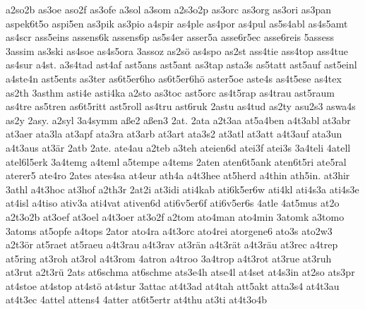 {    a2so2b
    as3oe
    aso2f
    as3ofe
    a3sol
    a3som
    a2s3o2p
    as3orc
    as3org
    as3ori
    as3pan
    aspek6t5o
    aspi5en
    as3pik
    as3pio
    a4spir
    as4ple
    as4por
    as4pul
    as5s4abl
    as4s5amt
    as4scr
    ass5eins
    assens6k
    assens6p
    as5s4er
    asser5a
    asse6r5ec
    asse6reis
    5assess
    3assim
    as3ski
    as4soe
    as4s5ora
    3assoz
    as2sö
    as4spo
    as2st
    ass4tie
    ass4top
    ass4tue
    as4sur
    a4st.
    a3s4tad
    ast4af
    ast5ans
    ast5ant
    as3tap
    asta3s
    as5tatt
    ast5auf
    ast5einl
    a4ste4n
    ast5ents
    as3ter
    as6t5er6ho
    as6t5er6hö
    aster5oe
    aste4s
    as4t5ese
    as4tex
    as2th
    3asthm
    asti4e
    asti4ka
    a2sto
    as3toc
    ast5orc
    as4t5rap
    as4trau
    ast5raum
    as4tre
    as5tren
    as6t5ritt
    ast5roll
    as4tru
    ast6ruk
    2astu
    as4tud
    as2ty
    asu2s3
    aswa4s
    as2y
    2asy.
    a2syl
    3a4symm
    aße2
    aßen3
    2at.
    2ata
    a2t3aa
    at5a4ben
    a4t3abl
    at3abr
    at3aer
    ata3la
    at3apf
    ata3ra
    at3arb
    at3art
    ata3s2
    at3atl
    at3att
    a4t3auf
    ata3un
    a4t3aus
    at3är
    2atb
    2ate.
    ate4au
    a2teb
    a3teh
    ateien6d
    atei3f
    atei3s
    3a4teli
    4atell
    atel6l5erk
    3a4temg
    a4teml
    a5tempe
    a4tems
    2aten
    aten6t5ank
    aten6t5ri
    ate5ral
    aterer5
    ate4ro
    2ates
    ates4sa
    at4eur
    ath4a
    a4t3hee
    at5herd
    a4thin
    ath5in.
    at3hir
    3athl
    a4t3hoc
    at3hof
    a2th3r
    2at2i
    at3idi
    ati4kab
    ati6k5er6w
    ati4kl
    ati4s3a
    ati4s3e
    at4isl
    a4tiso
    ativ3a
    ati4vat
    ativen6d
    ati6v5er6f
    ati6v5er6s
    4atle
    4at5mus
    at2o
    a2t3o2b
    at3oef
    at3oel
    a4t3oer
    at3o2f
    a2tom
    ato4man
    ato4min
    3atomk
    a3tomo
    3atoms
    at5opfe
    a4tops
    2ator
    ato4ra
    a4t3orc
    ato4rei
    atorgene6
    ato3s
    ato2w3
    a2t3ör
    at5raet
    at5raeu
    a4t3rau
    a4t3rav
    at3rän
    a4t3rät
    a4t3räu
    at3rec
    a4trep
    at5ring
    at3roh
    at3rol
    a4t3rom
    4atron
    a4troo
    3a4trop
    a4t3rot
    at3rue
    at3ruh
    at3rut
    a2t3rü
    2ats
    at6schma
    at6schme
    ats3e4h
    atse4l
    at4set
    at4s3in
    at2so
    ats3pr
    at4stoe
    at4stop
    at4stö
    at4stur
    3attac
    at4t3ad
    at4tah
    att5akt
    atta3s4
    at4t3au
    at4t3ec
    4attel
    attens4
    4atter
    at6t5ertr
    at4thu
    at3ti
    at4t3o4b
}

